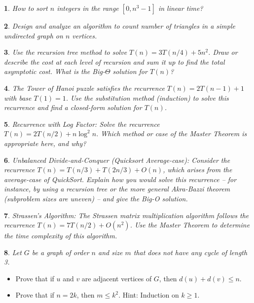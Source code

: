 \documentclass[%
addpoints]{exam}
\theoremstyle{problem}
\newtheorem{p}{}
\begin{document}
\begin{p}
How to sort $n$ integers in the range $[0,n^3-1]$ in linear time?
\hfill \end{p}

\begin{p}
Design and analyze an algorithm to count number of triangles in a simple undirected graph on $n$ vertices.
\hfill \end{p}

\begin{p}
Use the recursion tree method to solve \(T(n) = 3T(n/4) + 5n^2\). Draw or describe the cost at each level of recursion and sum it up to find the total asymptotic cost. What is the Big-\(\Theta\) solution for \(T(n)\)?  
\hfill\end{p}

\begin{p}
The Tower of Hanoi puzzle satisfies the recurrence \(T(n) = 2T(n-1) + 1\) with base \(T(1) = 1\). Use the substitution method (induction) to solve this recurrence and find a closed-form solution for \(T(n)\).  
\hfill\end{p}

\begin{p}
Recurrence with Log Factor: Solve the recurrence \(T(n) = 2T(n/2) + n \log^2 n\). Which method or case of the Master Theorem is appropriate here, and why?  
\hfill\end{p}

\begin{p}
Unbalanced Divide-and-Conquer (Quicksort Average-case): Consider the recurrence \(T(n) = T(n/3) + T(2n/3) + O(n)\), which arises from the average-case of QuickSort. Explain how you would solve this recurrence – for instance, by using a recursion tree or the more general Akra-Bazzi theorem (subproblem sizes are uneven) – and give the Big-O solution.  
\hfill\end{p}

\begin{p}
Strassen’s Algorithm: The Strassen matrix multiplication algorithm follows the recurrence \(T(n) = 7T(n/2) + O(n^2)\). Use the Master Theorem to determine the time complexity of this algorithm.  
\hfill\end{p}


\begin{p}
Let \( G \) be a graph of order \( n \) and size \( m \) that does not have any cycle of length 3.
\hfill\end{p}
\begin{itemize}
    \item Prove that if \( u \) and \( v \) are adjacent vertices of \( G \), then \( d(u) + d(v) \leq n \).
    \item Prove that if \( n = 2k \), then \( m \leq k^2 \). Hint: Induction on \( k \geq 1 \).
\end{itemize}
\end{document}

